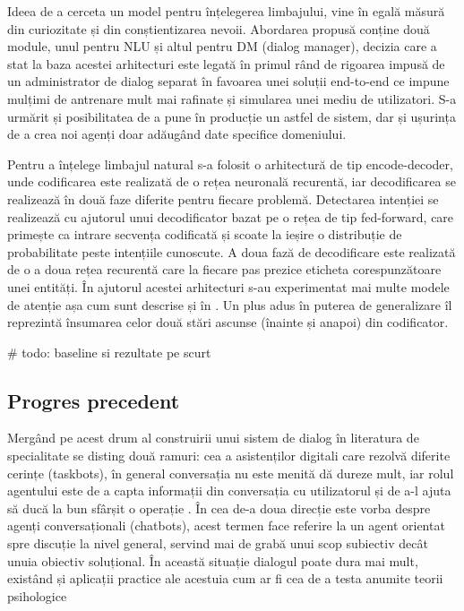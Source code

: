 Ideea de a cerceta un model pentru înțelegerea limbajului, vine în egală măsură din curiozitate și din conștientizarea nevoii. Abordarea propusă conține două module, unul pentru NLU și altul pentru DM (dialog manager), decizia care a stat la baza acestei arhitecturi este legată în primul rând de rigoarea impusă de un administrator de dialog separat în favoarea unei soluții end-to-end ce impune mulțimi de antrenare mult mai rafinate și simularea unei mediu de utilizatori. S-a urmărit și posibilitatea de a pune în producție un astfel de sistem, dar și ușurința de a crea noi agenți doar adăugând date specifice domeniului.


Pentru a înțelege limbajul natural s-a folosit o arhitectură de tip encode-decoder, unde codificarea este realizată de o rețea neuronală recurentă, iar decodificarea se realizează în două faze diferite pentru fiecare problemă. Detectarea intenției se realizează cu ajutorul unui decodificator bazat pe o rețea de tip fed-forward, care primește ca intrare secvența codificată și scoate la ieșire o distribuție de probabilitate peste intențiile cunoscute. A doua fază de decodificare este realizată de o a doua rețea recurentă care la fiecare pas prezice eticheta corespunzătoare unei entități. În ajutorul acestei arhitecturi s-au experimentat mai multe modele de atenție așa cum sunt descrise și în \cite{trans_luong_manning}. Un plus adus în puterea de generalizare îl reprezintă însumarea celor două stări ascunse (înainte și anapoi) din codificator.

\# todo: baseline si rezultate pe scurt

\subsection{Progres precedent}
Mergând pe acest drum al construirii unui sistem de dialog în literatura de specialitate se disting două ramuri: cea a asistenților digitali care rezolvă diferite cerințe (taskbots), în general conversația nu este menită dă dureze mult, iar rolul agentului este de a capta informații din conversația cu utilizatorul și de a-l ajuta să ducă la bun sfârșit o operație \cite{joint_online_bing, att_joint_bing}. În cea de-a doua direcție este vorba despre agenți conversaționali (chatbots), acest termen face referire la un agent orientat spre discuție la nivel general, servind mai de grabă unui scop subiectiv decât unuia obiectiv soluțional. În această situație dialogul poate dura mai mult, existând și aplicații practice ale acestuia cum ar fi cea de a testa anumite teorii psihologice \cite{weizenbaum}

